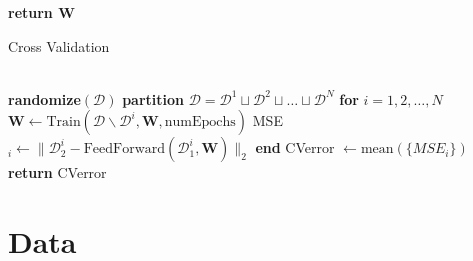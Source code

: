 \documentclass[prl,amsmath,amssymb,floatfix,superscriptaddress,notitlepage,twocolumn]{revtex4}
\begin{document}
{\begin{algorithm}[H]
\begin{algorithmic}[]
\State \textbf{return W}\\

\EndProcedure
\end{algorithmic}
\end{algorithm}

\begin{algorithm}[H]
\caption{Cross Validation}\label{cross_val}
\begin{algorithmic}[]
\\

\State \textbf{randomize}$(\mathcal{D})$
\State \textbf{partition} $\mathcal{D}=\mathcal{D}^1\sqcup\mathcal{D}^2\sqcup\dots\sqcup\mathcal{D}^N$
\State \textbf{for } $i=1,2,\dots,N$
\State \hspace{.25cm} $\textbf{W}\gets \text{Train}(\mathcal{D\backslash \mathcal{D}}^i, \textbf{W}, \text{numEpochs})$
\State \hspace{.25cm} MSE$_i\gets\|\mathcal{D}^i_2-\text{FeedForward}(\mathcal{D}^i_1,\textbf{W})\|_2$
\State \textbf{end}
\State CVerror $\gets \text{mean}(\{MSE_i\})$\\
\State \textbf{return} CVerror\\

\EndProcedure
\end{algorithmic}
\end{algorithm}

\section{Data}

}
\end{document}
